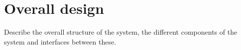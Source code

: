 \chapter{Overall design}

Describe the overall structure of the system, the different components of the system and interfaces between these.




